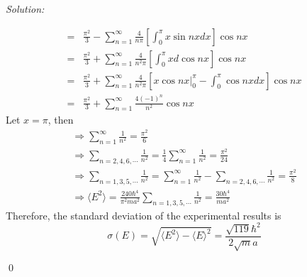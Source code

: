 \documentclass[12pt,a4paper]{article}
\newenvironment{sol}
    {\emph{Solution:}
    }
    {
    \qed
    }
\begin{document}
\begin{sol}
\begin{itemize}
\begin{align}
\nonumber=&\frac{\pi^2}{3}-\sum_{n=1}^{\infty}\frac{4}{n\pi}\left[\int_0^{\pi}x\sin nxdx\right]\cos nx\\
\nonumber=&\frac{\pi^2}{3}+\sum_{n=1}^{\infty}\frac{4}{n^2\pi}\left[\int_0^{\pi}xd\cos nx\right]\cos nx\\
\nonumber=&\frac{\pi^2}{3}+\sum_{n=1}^{\infty}\frac{4}{n^2\pi}\left[\left.x\cos nx\right|_0^{\pi}-\int_0^{\pi}\cos nxdx\right]\cos nx\\
=&\frac{\pi^2}{3}+\sum_{n=1}^{\infty}\frac{4(-1)^n}{n^2}\cos nx
\end{align}
Let $x=\pi$, then
\begin{gather}
\Longrightarrow\sum_{n=1}^{\infty}\frac{1}{n^2}=\frac{\pi^2}{6}\\
\Longrightarrow\sum_{n=2,4,6,\cdots}\frac{1}{n^2}=\frac{1}{4}\sum_{n=1}^{\infty}\frac{1}{n^2}=\frac{\pi^2}{24}\\
\Longrightarrow\sum_{n=1,3,5,\cdots}\frac{1}{n^2}=\sum_{n=1}^{\infty}\frac{1}{n^2}-\sum_{n=2,4,6,\cdots}\frac{1}{n^2}=\frac{\pi^2}{8}\\
\Longrightarrow\langle E^2\rangle=\frac{240\hbar^4}{\pi^2ma^2}\sum_{n=1,3,5,\cdots}\frac{1}{n^2}=\frac{30\hbar^4}{ma^2}
\end{gather}
Therefore, the standard deviation of the experimental results is
\begin{equation}
\sigma(E)=\sqrt{\langle E^2\rangle-\langle E\rangle^2}=\frac{\sqrt{119}\hbar^2}{2\sqrt{m}a}
\end{equation}
\end{itemize}
\end{sol}
\end{document}
